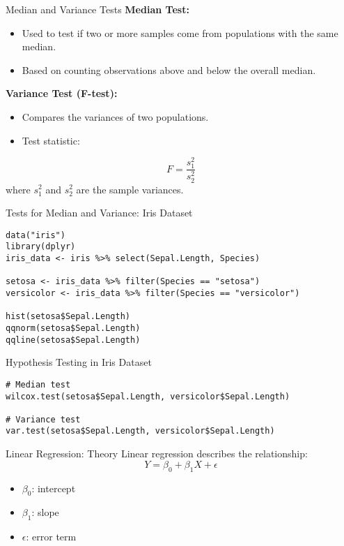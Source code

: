 \documentclass{beamer}
\begin{document}
\begin{frame}{Median and Variance Tests}
\textbf{Median Test:}
\begin{itemize}
    \item Used to test if two or more samples come from populations with the same median.
    \item Based on counting observations above and below the overall median.
\end{itemize}

\textbf{Variance Test (F-test):}
\begin{itemize}
    \item Compares the variances of two populations.
    \item Test statistic:
\end{itemize}
\[
F = \frac{s_1^2}{s_2^2}
\]
where \( s_1^2 \) and \( s_2^2 \) are the sample variances.
\end{frame}
\begin{frame}[fragile]{Tests for Median and Variance: Iris Dataset}
\begin{verbatim}
data("iris")
library(dplyr)
iris_data <- iris %>% select(Sepal.Length, Species)

setosa <- iris_data %>% filter(Species == "setosa")
versicolor <- iris_data %>% filter(Species == "versicolor")

hist(setosa$Sepal.Length)
qqnorm(setosa$Sepal.Length)
qqline(setosa$Sepal.Length)
\end{verbatim}
\end{frame}

\begin{frame}[fragile]{Hypothesis Testing in Iris Dataset}
\begin{verbatim}
# Median test
wilcox.test(setosa$Sepal.Length, versicolor$Sepal.Length)

# Variance test
var.test(setosa$Sepal.Length, versicolor$Sepal.Length)
\end{verbatim}
\end{frame}

\begin{frame}{Linear Regression: Theory}
Linear regression describes the relationship:
\[
Y = \beta_0 + \beta_1 X + \epsilon
\]
\begin{itemize}
    \item $\beta_0$: intercept
    \item $\beta_1$: slope
    \item $\epsilon$: error term
\end{itemize}
\end{frame}
\end{document}
